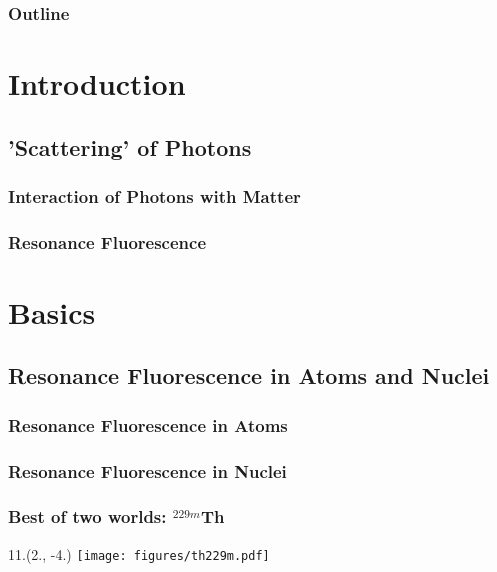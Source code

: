 \documentclass{beamer}
\begin{document}
\begin{frame}
    \titlepage
\end{frame}

\begin{frame}
    \frametitle{Outline}
    \tableofcontents
\end{frame}

\section{Introduction}

\subsection{'Scattering' of Photons}

\begin{frame}
    \frametitle{Interaction of Photons with Matter}
\end{frame}

\begin{frame}
    \frametitle{Resonance Fluorescence}
\end{frame}

\section{Basics}

\subsection{Resonance Fluorescence in Atoms and Nuclei}

\begin{frame}
    \frametitle{Resonance Fluorescence in Atoms}
\end{frame}

\begin{frame}
    \frametitle{Resonance Fluorescence in Nuclei}
\end{frame}

\begin{frame}
    \frametitle{Best of two worlds: $^{229m}$Th}
    \begin{textblock}{11.}(2., -4.)
        \texttt{[image: figures/th229m.pdf]}
    \end{textblock}
\end{frame}
\end{document}
